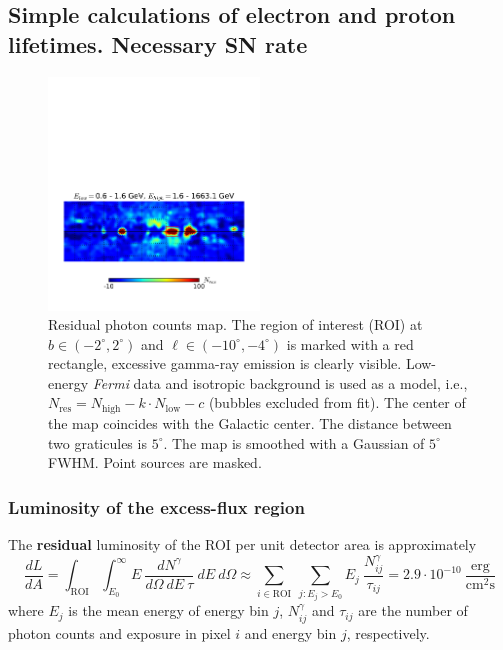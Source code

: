 \documentclass[a4paper]{article}
\begin{document}
\subsection{Simple calculations of electron and proton lifetimes. Necessary SN rate}


\begin{figure}[h]
	\centering
	\includegraphics[width=0.5\textwidth]{gnomview_1}
    \caption{Residual photon counts map. The region of interest (ROI) at $b \in (-2^\circ, 2^\circ)$ and $\ell \in (-10^\circ, -4^\circ)$ is marked with a red rectangle, excessive gamma-ray emission is clearly visible. Low-energy \textit{Fermi} data and isotropic background is used as a model, i.e., $N_\text{res} = N_\text{high} - k \cdot N_\text{low} - c$ (bubbles excluded from fit). The center of the map coincides with the Galactic center. The distance between two graticules is $5^\circ$. The map is smoothed with a Gaussian of $5^\circ$ FWHM. Point sources are masked.}
    \label{gnomview}
\end{figure}

\subsubsection{Luminosity of the excess-flux region}
The \textbf{residual} luminosity of the ROI per unit detector area is approximately 
\begin{equation}
\label{eq_dLdA}
\frac{dL}{dA} = \int_\text{ROI} \int_{E_0}^\infty E\ \frac{dN^\gamma}{d\Omega\ dE\ \tau}\ dE\ d\Omega \approx \sum_{i \in \text{ROI}}\ \sum_{j: E_j > E_0}  E_j\ \frac{N_{ij}^\gamma}{\tau_{ij}} = 2.9 \cdot 10^{-10}\ \frac{\text{erg}}{\text{cm}^2\text{s}}
\end{equation}
where $E_j$ is the mean energy of energy bin $j$, $N_{ij}^\gamma$ and $\tau_{ij}$ are the number of photon counts and exposure in pixel $i$ and energy bin $j$, respectively.\\
\end{document}
